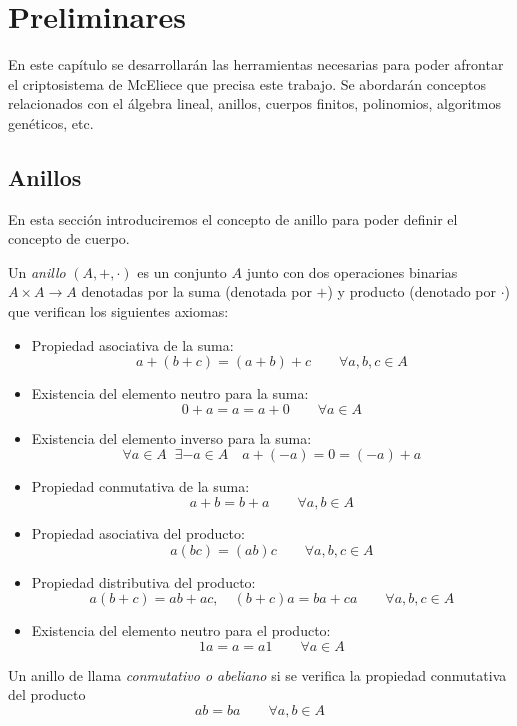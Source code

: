 
\chapter{Preliminares}

En este capítulo se desarrollarán las herramientas necesarias para poder afrontar el criptosistema de McEliece 
que precisa este trabajo. Se abordarán conceptos relacionados con el álgebra lineal, anillos, cuerpos finitos, polinomios, algoritmos genéticos, etc.

\section{Anillos}

En esta sección introduciremos el concepto de anillo para poder definir el concepto de cuerpo.

\begin{definition}
    Un \emph{anillo} $(A, +, \cdot )$ es un conjunto $A$ junto con dos operaciones binarias $A \times A \rightarrow A$ denotadas
    por la suma (denotada por $+$) y producto (denotado por $\cdot$) que verifican los siguientes axiomas:

    \begin{itemize}
        \item Propiedad asociativa de la suma: 
        $$  a + (b + c) = (a + b) + c \qquad \forall a,b,c \in A$$
        \item Existencia del elemento neutro para la suma:
        $$ 0 + a = a = a + 0 \qquad \forall a \in A$$
        \item Existencia del elemento inverso para la suma:
        $$ \forall a \in A \; \; \exists -a \in A \quad a + (-a) = 0 = (-a) + a $$
        \item Propiedad conmutativa de la suma:
        $$ a + b = b + a \qquad \forall a,b \in A $$
        \item Propiedad asociativa del producto:
        $$ a(bc) = (ab)c \qquad \forall a,b,c \in A $$
        \item Propiedad distributiva del producto:
        $$ a(b + c) = ab + ac, \quad (b + c)a = ba + ca \qquad \forall a,b,c \in A $$
        \item Existencia del elemento neutro para el producto:
        $$ 1a = a = a1 \qquad \forall a \in A $$
        
    \end{itemize}

    Un anillo de llama \emph{conmutativo o abeliano} si se verifica la propiedad conmutativa del producto 
    $$ ab = ba \qquad \forall a,b \in A $$
\end{definition}

